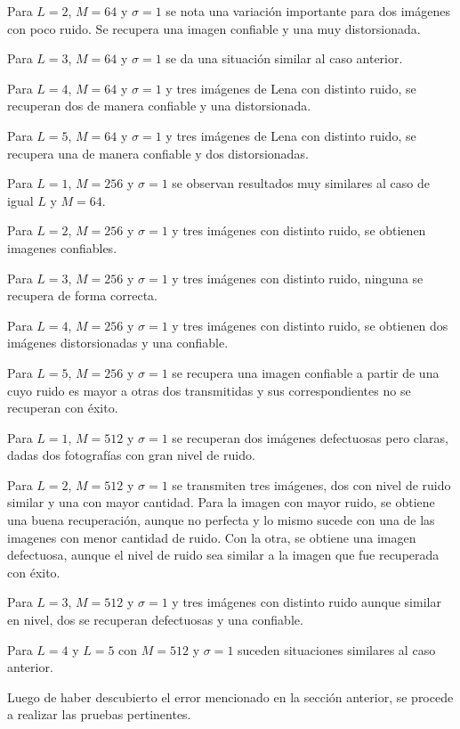 \documentclass[10pt,journal,compsoc]{IEEEtran}
\begin{document}
Para $L = {2}$, $M = {64}$ y $\sigma = 1$ se nota una variaci\'on importante para dos im\'agenes con poco ruido. Se recupera una imagen confiable y una muy distorsionada.

Para $L = {3}$, $M = {64}$ y $\sigma = 1$ se da una situaci\'on similar al caso anterior.

Para $L = {4}$, $M = {64}$ y $\sigma = 1$ y tres im\'agenes de Lena con distinto ruido, se recuperan dos de manera confiable y una distorsionada.

Para $L = {5}$, $M = {64}$ y $\sigma = 1$ y tres im\'agenes de Lena con distinto ruido, se recupera una de manera confiable y dos distorsionadas.

Para $L = {1}$, $M = {256}$ y $\sigma = 1$ se observan resultados muy similares al caso de igual $L$ y $M = {64}$.

Para $L = {2}$, $M = {256}$ y $\sigma = 1$ y tres im\'agenes con distinto ruido, se obtienen imagenes confiables.

Para $L = {3}$, $M = {256}$ y $\sigma = 1$ y tres im\'agenes con distinto ruido, ninguna se recupera de forma correcta.

Para $L = {4}$, $M = {256}$ y $\sigma = 1$ y tres im\'agenes con distinto ruido, se obtienen dos im\'agenes distorsionadas y una confiable.

Para $L = {5}$, $M = {256}$ y $\sigma = 1$ se recupera una imagen confiable a partir de una cuyo ruido es mayor a otras dos transmitidas y sus correspondientes no se recuperan con \'exito.

Para $L = {1}$, $M = {512}$ y $\sigma = 1$ se recuperan dos im\'agenes defectuosas pero claras, dadas dos fotograf\'ias con gran nivel de ruido.

Para $L = {2}$, $M = {512}$ y $\sigma = 1$ se transmiten tres im\'agenes, dos con nivel de ruido similar y una con mayor cantidad. Para la imagen con mayor ruido, se obtiene una buena recuperaci\'on, aunque no perfecta y lo mismo sucede con una de las imagenes con menor cantidad de ruido. Con la otra, se obtiene una imagen defectuosa, aunque el nivel de ruido sea similar a la imagen que fue recuperada con \'exito.

Para $L = {3}$, $M = {512}$ y $\sigma = 1$ y tres im\'agenes con distinto ruido aunque similar en nivel, dos se recuperan defectuosas y una confiable.

Para $L = {4}$ y $L = {5}$ con $M = {512}$ y $\sigma = 1$ suceden situaciones similares al caso anterior.

Luego de haber descubierto el error mencionado en la secci\'on anterior, se procede a realizar las pruebas pertinentes.
\end{document}
